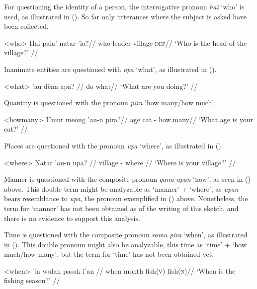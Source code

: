 \documentclass[12pt]{article}
\begin{document}
For questioning the identity of a person, the interrogative pronoun \textit{hai} `who' is used, as illustrated in (). So far only utterances where the subject is asked have been collected.

\ex<who>
\begingl %
\gla Hai pala' natar 'ia?//
\glb who leader village \textsc{def}//
\glft `Who is the head of the village?' //
\endgl
\xe



Inanimate entities are questioned with \textit{apa} `what', as illustrated in ().

\ex<what>
\begingl %
\gla 'au dëna apa? //
\glb \Second{}\Sg{} do what//
\glft `What are you doing?' // 
\endgl
\xe


Quantity is questioned with the pronoun \textit{pira} `how many/how much'.

\ex<howmany>
\begingl %
\gla Umur meong 'au-n pira?//
\glb age cat \Second{}\Sg{}-\Poss{} how.many//
\glft `What age is your cat?' // 
\endgl 
\xe


Places are questioned with the pronoun \textit{upa} `where', as illustrated in ().

\ex<where>
\begingl %
\gla Natar 'au-n upa? //
\glb village \Second{}\Sg{}-\Poss{} where //
\glft `Where is your village?' // 
\endgl
\xe 

Manner is questioned with the composite pronoun \textit{ganu upan} `how', as seen in () above. This double term might be analyzable as `manner' + `where', as \textit{upan} bears resemblance to \textit{upa}, the pronoun exemplified in () above. Nonetheless, the term for `manner' has not been obtained as of the writing of this sketch, and there is no evidence to support this analysis.

Time is questioned with the composite pronoun \textit{rama pira} `when', as illustrated in (). This double pronoun might also be analyzable, this time as `time' + `how much/how many', but the term for `time' has not been obtained yet.

\ex<when>
\begingl %
 'ia wulan pasak i'an //
\glb when \Loc{} month fish(\textsc{v}) fish(\textsc{n})//
\glft `When is the fishing season?' // 
\endgl
\xe
\end{document}
